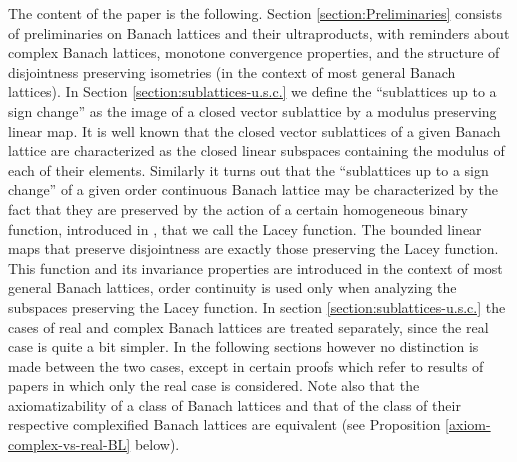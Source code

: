 \documentclass[11pt]{amsart}
\theoremstyle{plain}
\theoremstyle{remark}
\begin{document}
The content of the paper is the following. Section \ref{section:Preliminaries} consists of preliminaries on Banach lattices and their ultraproducts, with reminders  about complex Banach lattices, monotone convergence properties,  and  the structure of disjointness preserving isometries (in the context of most general Banach lattices). In Section \ref{section:sublattices-u.s.c.} we define the ``sublattices up to a sign change'' as the image of a closed vector sublattice by a modulus preserving linear map. It is well known that the closed vector sublattices of a given Banach lattice are characterized as the closed linear subspaces containing the modulus of each of their elements. Similarly it turns out that the ``sublattices up to a sign change'' of a given order continuous Banach lattice may be characterized by the fact that they are preserved by the action of a certain homogeneous binary function, introduced in \cite{L}, that we call the Lacey function.  The bounded linear maps that preserve disjointness are exactly those preserving the Lacey function. This function and its invariance properties are introduced in the context of most general Banach lattices, order continuity is used only when analyzing the subspaces preserving the Lacey function. In section \ref{section:sublattices-u.s.c.} the cases of real and complex Banach lattices are treated separately, since the real case is quite a bit simpler. In the following sections however no distinction is made between the two cases, except in certain proofs which refer to results of papers in which only the real case is considered. Note also that the axiomatizability of a class of Banach lattices and that of the class of their respective  complexified Banach lattices are equivalent (see Proposition \ref{axiom-complex-vs-real-BL} below).
\end{document}

